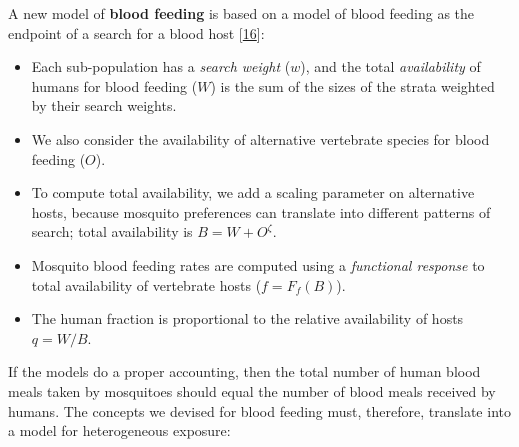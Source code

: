 \documentclass[
]{book}
\begin{document}
A new model of \textbf{blood feeding} is based on a model of blood feeding as the endpoint of a search for a blood host {[}\protect\hyperlink{ref-WuSL2022SpatialDynamics}{16}{]}:

\begin{itemize}
\item
  Each sub-population has a \emph{search weight} (\(w\)), and the total \emph{availability} of humans for blood feeding (\(W\)) is the sum of the sizes of the strata weighted by their search weights.
\item
  We also consider the availability of alternative vertebrate species for blood feeding (\(O\)).
\item
  To compute total availability, we add a scaling parameter on alternative hosts, because mosquito preferences can translate into different patterns of search; total availability is \(B=W + O^\zeta\).
\item
  Mosquito blood feeding rates are computed using a \emph{functional response} to total availability of vertebrate hosts (\(f = F_f(B)\)).
\item
  The human fraction is proportional to the relative availability of hosts \(q = W/B\).
\end{itemize}

If the models do a proper accounting, then the total number of human blood meals taken by mosquitoes should equal the number of blood meals received by humans. The concepts we devised for blood feeding must, therefore, translate into a model for heterogeneous exposure:
\end{document}

